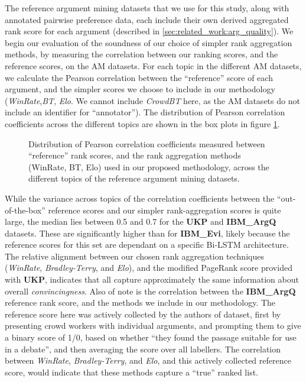 \documentclass[notitlepage,12pt]{jedm}
\begin{document}
The reference argument mining datasets that we use for this study, along 
with annotated pairwise preference data, each include their own derived 
aggregated rank score for each argument (described in 
\ref{sec:related_work:arg_quality}).
We begin our evaluation of the soundness of our choice of simpler rank 
aggregation methods, by measuring the correlation between our ranking scores, 
and the reference scores, on the AM datasets.
For each topic in the different AM datasets, we calculate the Pearson 
correlation between the ``reference'' score of each argument, and the simpler 
scores we choose to include in our methodology (\textit{WinRate},\textit{BT}, 
\textit{Elo}. We cannot include \textit{CrowdBT} here, as the AM datasets do 
not include an identifier for ``annotator'').
The distribution of Pearson correlation coefficients across the different 
topics are shown in the box plots in figure \ref{fig:corr_to_reference_score}.

\begin{figure}[H]
	\centering
	\scalebox{0.5}{}
	\caption{Distribution of Pearson correlation coefficients measured between 
		``reference'' rank scores, and the rank aggregation methods (WinRate, 
		BT, 
		Elo) used in our proposed methodology, across the different topics of 
		the 
		reference argument mining datasets.}
	\label{fig:corr_to_reference_score}
\end{figure}

While the variance across topics of the correlation coefficients between the 
``out-of-the-box'' reference scores and our simpler rank-aggregation scores is 
quite large, the median lies between 0.5 and 0.7 for the \textbf{UKP} and 
\textbf{IBM\_ArgQ} datasets.
These are significantly higher than for \textbf{IBM\_Evi}, likely because the 
reference scores for this set are dependant on a specific Bi-LSTM architecture.
The relative alignment between our chosen rank aggregation techniques 
(\textit{WinRate}, \textit{Bradley-Terry}, and \textit{Elo}), and the modified 
PageRank score provided with \textbf{UKP}, indicates that all capture 
approximately the same information about overall \textit{convincingness}.
Also of note is the correlation between the \textbf{IBM\_ArgQ} reference rank 
score, and the methods we include in our methodology. 
The reference score here was actively collected by the authors of dataset, 
first by presenting crowd workers with individual arguments, and prompting them 
to give a binary score of 1/0, based on whether ``they found the passage 
suitable for use in a debate'', and then averaging the score over all labellers.
The correlation between \textit{WinRate}, \textit{Bradley-Terry}, and 
\textit{Elo}, and this actively collected reference score, would indicate that 
these methods capture a ``true'' ranked list.
   
\end{document}
